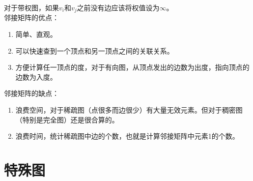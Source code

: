 \begin{table}[H]
	\centering
	\caption{带权图邻接矩阵}
\end{table}

对于带权图，如果$ v_i $和$ v_j $之前没有边应该将权值设为$ \infty $。\\

邻接矩阵的优点：

\begin{enumerate}
	\item 简单、直观。
	\item 可以快速查到一个顶点和另一顶点之间的关联关系。
	\item 方便计算任一顶点的度，对于有向图，从顶点发出的边数为出度，指向顶点的边数为入度。
\end{enumerate}

邻接矩阵的缺点：

\begin{enumerate}
	\item 浪费空间，对于稀疏图（点很多而边很少）有大量无效元素。但对于稠密图（特别是完全图）还是很合算的。
	\item 浪费时间，统计稀疏图中边的个数，也就是计算邻接矩阵中元素1的个数。
\end{enumerate}

\newpage

\section{特殊图}

